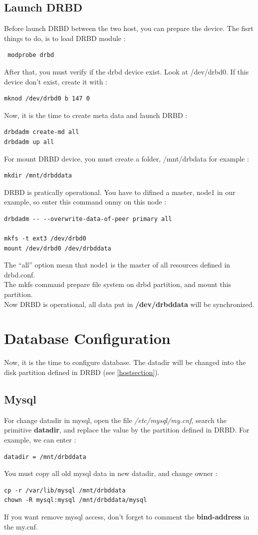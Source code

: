 \documentclass[a4paper,10pt]{report}
\begin{document}
\subsection{Launch DRBD}
Before launch DRBD between the two host, you can prepare the device. The fisrt things to do, is to load DRBD module :
\begin{lstlisting}
 modprobe drbd
\end{lstlisting}
After that, you must verify if the drbd device exist. Look at /dev/drbd0. If this device don't exist, create it with :
\begin{lstlisting}
mknod /dev/drbd0 b 147 0
\end{lstlisting}
Now, it is the time to create meta data and launch DRBD :
\begin{lstlisting}
drbdadm create-md all
drbdadm up all
\end{lstlisting}
For mount DRBD device, you must create a folder, /mnt/drbdata for example :
\begin{lstlisting}
mkdir /mnt/drbddata
\end{lstlisting}
DRBD is pratically operational. You have to difined a master, node1 in our example, so enter this command onmy on this node :
\begin{lstlisting}
drbdadm -- --overwrite-data-of-peer primary all

mkfs -t ext3 /dev/drbd0
mount /dev/drbd0 /dev/drbddata
\end{lstlisting}
The ``all'' option mean that node1 is the master of all resources defined in drbd.conf.\\
The mkfs command prepare file system on drbd partition, and mount this partition.\\
Now DRBD is operational, all data put in \textbf{/dev/drbddata} will be synchronized.




\section{Database Configuration}
Now, it is the time to configure database. The datadir will be changed into the disk partition defined in DRBD (see  \ref{hostsection}).

\subsection{Mysql}
For change datadir in mysql, open the file \textit{/etc/mysql/my.cnf}, search the primitive \textbf{datadir}, and replace the value by the partition defined in DRBD.
For example, we can enter :
\begin{lstlisting}
datadir = /mnt/drbddata
\end{lstlisting}
You must copy all old mysql data in new datadir, and change owner :
\begin{lstlisting}
cp -r /var/lib/mysql /mnt/drbddata
chown -R mysql:mysql /mnt/drbddata/mysql
\end{lstlisting}
If you want remove mysql access, don't forget to comment the \textbf{bind-address} in the my.cnf.
\end{document}
